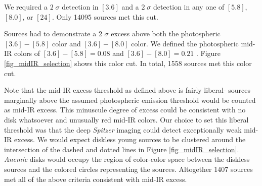 We required a $2\;\sigma$ detection in $[3.6]$ and a $2\;\sigma$ detection in any one of $[5.8]$, $[8.0]$, or $[24]$.  Only 14095 sources met this cut.  

Sources had to demonstrate a 2 $\sigma$  excess above both the photospheric $[3.6]-[5.8]$ color and $[3.6]-[8.0]$ color.  We defined the photospheric mid-IR colors of $[3.6]-[5.8]=0.08$ and $[3.6]-[8.0]=0.21$ \citep{2006ApJ...651..502P}.  Figure \ref{fig_midIR_selection} shows this color cut.  In total, 1558 sources met this color cut.  

Note that the mid-IR excess threshold as defined above is fairly liberal- sources marginally above the assumed photospheric emission threshold would be counted as mid-IR excess.  This minuscule degree of excess could be consistent with no disk whatsoever and unusually red mid-IR colors.  Our choice to set this liberal threshold was that the deep \emph{Spitzer} imaging could detect exceptionally weak mid-IR excess.  We would expect diskless young sources to be clustered around the intersection of the dashed and dotted lines in Figure \ref{fig_midIR_selection}.  \emph{Anemic} disks would occupy the region of color-color space between the diskless sources and the colored circles representing the \citet{allers06} sources.  Altogether 1407 sources met all of the above criteria consistent with mid-IR excess.


